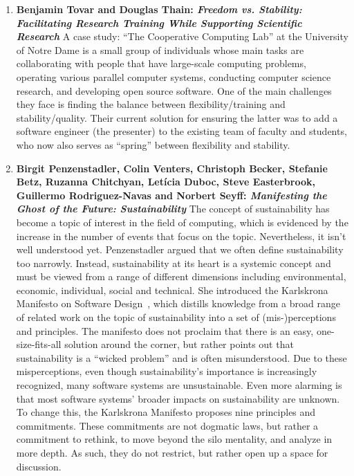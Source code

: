 \documentclass[11pt, oneside]{amsart}
\begin{document}
\begin{enumerate}
\item \textbf{Benjamin Tovar and Douglas Thain: \textit{Freedom vs. Stability:
Facilitating Research Training While Supporting Scientific Research}}
A case study: ``The Cooperative Computing Lab'' at the University of Notre Dame
is a small group of individuals whose main tasks are collaborating with
people that have large-scale computing problems, operating various parallel
computer systems, conducting computer science research, and developing open
source software. One of the main challenges they face is finding the balance
between flexibility/training and stability/quality. Their current solution for
ensuring the latter was to add a software engineer (the presenter) to the
existing team of faculty and students, who now also serves as ``spring''
between flexibility and stability.

\item \textbf{Birgit Penzenstadler, Colin Venters, Christoph Becker, Stefanie
Betz, Ruzanna Chitchyan, Let\'{i}cia Duboc, Steve Easterbrook, Guillermo
Rodriguez-Navas and Norbert Seyff: \textit{Manifesting the Ghost of the Future:
Sustainability}}
The concept of sustainability has become a topic of interest in the field of
computing, which is evidenced by the increase in the number of events that
focus on the topic. Nevertheless, it isn't well understood yet. Penzenstadler
argued that we often define sustainability too narrowly. Instead,
sustainability at its heart is a systemic concept and must be viewed from a
range of different dimensions including environmental, economic, individual,
social and technical. She introduced the Karlskrona Manifesto on Software
Design~\cite{Becker:2014}, which distills knowledge from a broad range of related work on the
topic of sustainability into a set of (mis-)perceptions and principles. The
manifesto does not proclaim that there is an easy, one-size-fits-all solution
around the corner, but rather points out that sustainability is a ``wicked
problem'' and is often misunderstood. Due to these misperceptions, even though
sustainability's importance is increasingly recognized, many software systems
are unsustainable. Even more alarming is that most software systems' broader
impacts on sustainability are unknown. To change this, the Karlskrona Manifesto
proposes nine principles and commitments. These commitments are not dogmatic
laws, but rather a commitment to rethink, to move beyond the silo mentality,
and analyze in more depth. As such, they do not restrict, but rather open up a
space for discussion.


\end{enumerate}
\end{document}
